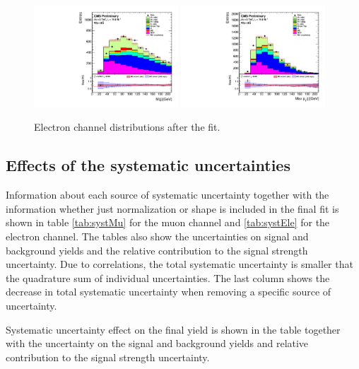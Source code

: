 \begin{figure}[htbp]
		\includegraphics[width=0.48\textwidth]{Figures/Results/Electron/postfit/Wbb_H_mass_doQCD1.pdf}
		\includegraphics[width=0.48\textwidth]{Figures/Results/Electron/postfit/Wbb_max_hJet_pt_doQCD1.pdf}		
	\caption{Electron channel distributions after the fit.}
	\label{fig:Wbb_postfit_ele}
\end{figure}

\subsection{Effects of the systematic uncertainties}
\label{sec:systEff}

Information about each source of systematic uncertainty together with the information whether just normalization or shape is included in the final fit is shown in table \ref{tab:systMu} for the muon channel and \ref{tab:systEle} for the electron channel. The tables also show the uncertainties on signal and background yields and the relative contribution to the signal strength uncertainty.
Due to correlations, the total systematic uncertainty is smaller that the quadrature sum of individual uncertainties. The last column shows the decrease in total systematic uncertainty when removing a specific source of uncertainty.

\begin{table}
\caption[Systematic uncertainties in the muon channel.]{Systematic uncertainty effect on the final yield is shown in the table together with the uncertainty on the signal and background yields and relative contribution to the signal strength uncertainty. }
\label{tab:systMu}

\end{table}

